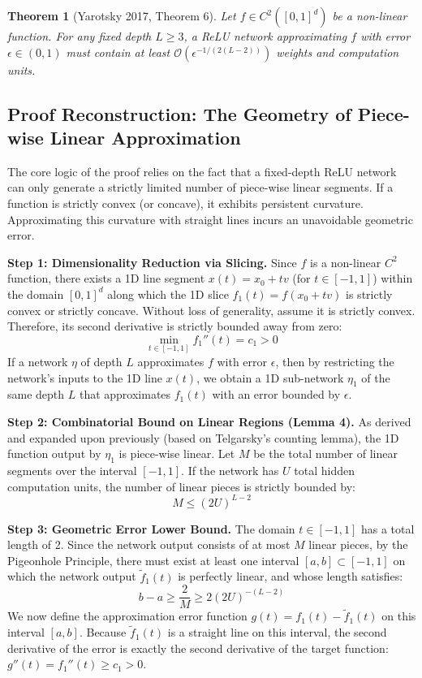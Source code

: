 \documentclass[12pt]{article}
\newtheorem{theorem}{Theorem}
\begin{document}
\begin{theorem}[Yarotsky 2017, Theorem 6]
Let $f \in C^2([0,1]^d)$ be a non-linear function. For any fixed depth $L \ge 3$, a ReLU network approximating $f$ with error $\epsilon \in (0,1)$ must contain at least $\mathcal{O}(\epsilon^{-1/(2(L-2))})$ weights and computation units.
\end{theorem}

\subsection{Proof Reconstruction: The Geometry of Piece-wise Linear Approximation}
The core logic of the proof relies on the fact that a fixed-depth ReLU network can only generate a strictly limited number of piece-wise linear segments. If a function is strictly convex (or concave), it exhibits persistent curvature. Approximating this curvature with straight lines incurs an unavoidable geometric error.

\textbf{Step 1: Dimensionality Reduction via Slicing.} 
Since $f$ is a non-linear $C^2$ function, there exists a 1D line segment $x(t) = x_0 + t v$ (for $t \in [-1, 1]$) within the domain $[0,1]^d$ along which the 1D slice $f_1(t) = f(x_0 + tv)$ is strictly convex or strictly concave. Without loss of generality, assume it is strictly convex. Therefore, its second derivative is strictly bounded away from zero:
\begin{equation}
\min_{t \in [-1,1]} f_1''(t) = c_1 > 0
\end{equation}
If a network $\eta$ of depth $L$ approximates $f$ with error $\epsilon$, then by restricting the network's inputs to the 1D line $x(t)$, we obtain a 1D sub-network $\eta_1$ of the same depth $L$ that approximates $f_1(t)$ with an error bounded by $\epsilon$.

\textbf{Step 2: Combinatorial Bound on Linear Regions (Lemma 4).}
As derived and expanded upon previously (based on Telgarsky's counting lemma), the 1D function output by $\eta_1$ is piece-wise linear. Let $M$ be the total number of linear segments over the interval $[-1, 1]$. If the network has $U$ total hidden computation units, the number of linear pieces is strictly bounded by:
\begin{equation}
M \le (2U)^{L-2} \label{eq:linear_pieces_bound}
\end{equation}

\textbf{Step 3: Geometric Error Lower Bound.}
The domain $t \in [-1,1]$ has a total length of 2. Since the network output consists of at most $M$ linear pieces, by the Pigeonhole Principle, there must exist at least one interval $[a,b] \subset [-1,1]$ on which the network output $\tilde{f}_1(t)$ is perfectly linear, and whose length satisfies:
\begin{equation}
b - a \ge \frac{2}{M} \ge 2(2U)^{-(L-2)} \label{eq:interval_length}
\end{equation}
We now define the approximation error function $g(t) = f_1(t) - \tilde{f}_1(t)$ on this interval $[a,b]$. Because $\tilde{f}_1(t)$ is a straight line on this interval, the second derivative of the error is exactly the second derivative of the target function: $g''(t) = f_1''(t) \ge c_1 > 0$.
\end{document}
